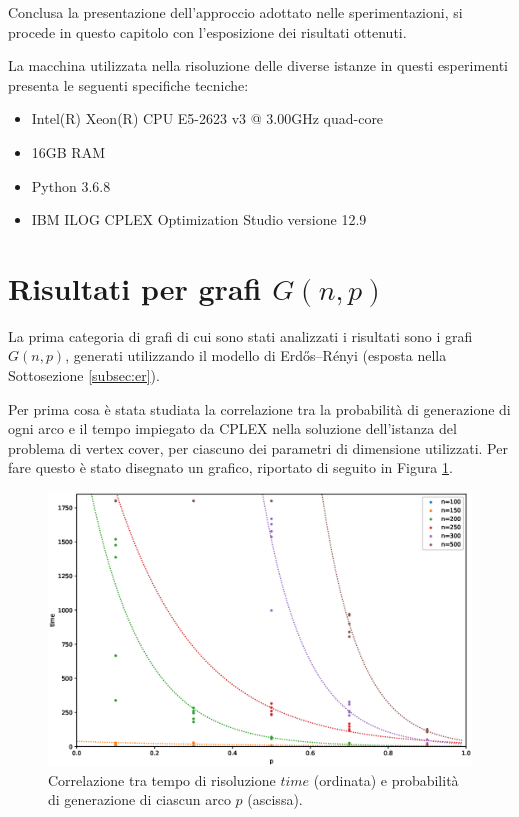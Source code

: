 Conclusa la presentazione dell'approccio adottato nelle sperimentazioni, si procede in questo capitolo con l'esposizione dei risultati ottenuti. 

La macchina utilizzata nella risoluzione delle diverse istanze in questi esperimenti presenta le seguenti specifiche tecniche:
\begin{itemize}
\item Intel(R) Xeon(R) CPU E5-2623 v3 @ 3.00GHz quad-core
\item 16GB RAM
\item Python 3.6.8
\item IBM ILOG CPLEX Optimization Studio versione 12.9
\end{itemize}

\newpage
\section{Risultati per grafi $G(n,p)$}
La prima categoria di grafi di cui sono stati analizzati i risultati sono i grafi $G(n,p)$, generati utilizzando il modello di Erdős–Rényi (esposta nella Sottosezione \ref{subsec:er}).

Per prima cosa è stata studiata la correlazione tra la probabilità di generazione di ogni arco e il tempo impiegato da CPLEX nella soluzione dell'istanza del problema di vertex cover, per ciascuno dei parametri di dimensione utilizzati. Per fare questo è stato disegnato un grafico, riportato di seguito in Figura \ref{fig:gnp2d}.
\vspace{-0.5cm}
\begin{figure}[h!]
     \centering
       \includegraphics[scale=0.4]{images/gnp-2d.eps}
       \caption{Correlazione tra tempo di risoluzione $time$ (ordinata) e probabilità di generazione di ciascun arco $p$ (ascissa).}
        \label{fig:gnp2d}
\end{figure}

